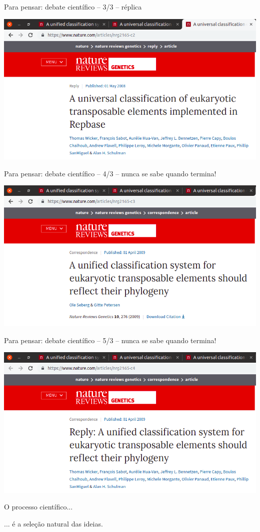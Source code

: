 \documentclass{beamer}
\begin{document}
\begin{frame}{\tiny Para pensar: debate científico -- 3/3 -- réplica}
  \begin{center}
    \includegraphics[width=\textwidth]{Encerramento/polemica3}
  \end{center}
\end{frame}

\begin{frame}{\tiny Para pensar: debate científico -- 4/3 -- nunca se sabe quando termina!}
  \begin{center}
    \includegraphics[width=\textwidth]{Encerramento/polemica4}
  \end{center}
\end{frame}

\begin{frame}{\tiny Para pensar: debate científico -- 5/3 -- nunca se sabe quando termina!}
  \begin{center}
    \includegraphics[width=\textwidth]{Encerramento/polemica5}
  \end{center}
\end{frame}

\begin{frame}
  \begin{center}
    O processo científico...

    \bigskip
    \bigskip
    ... é a seleção natural das ideias.
  \end{center}
\end{frame}
\end{document}
